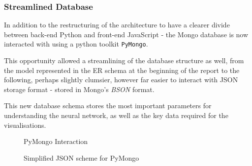 \documentclass[a4paper,11pt,titlepage]{article}
\begin{document}
	\subsubsection{Streamlined Database}
	In addition to the restructuring of the architecture to have a clearer divide between back-end Python and front-end JavaScript - the Mongo database is now interacted with using a python toolkit \texttt{PyMongo}. 
	\par 
	This opportunity allowed a streamlining of the database structure as well, from the model represented in the ER schema at the beginning of the report to the following, perhaps slightly clumsier, however far easier to interact with JSON storage format - stored in Mongo's \textit{BSON} format.
	\par 
	This new database schema stores the most important parameters for understanding the neural network, as well as the key data required for the visualisations.
	
	\begin{figure}[H]
    			\caption{PyMongo Interaction}%
	\end{figure}		
	
	\begin{figure}[H]
    			\caption{Simplified JSON scheme for PyMongo}%
	\end{figure}
	
\end{document}
